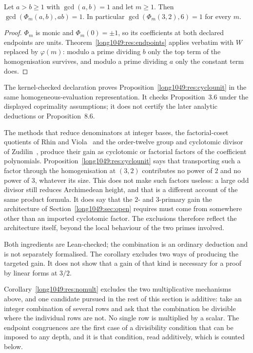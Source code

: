 \documentclass[11pt]{article}
\begin{document}
\begin{proposition}
\label{long1049:res:cyclounit}
Let $a>b\ge1$ with $\gcd(a,b)=1$ and let $m\ge1$.  Then
$\gcd(\Phi_m(a,b),ab)=1$.  In particular $\gcd(\Phi_m(3,2),6)=1$ for every $m$.
\end{proposition}

\begin{proof}
$\Phi_m$ is monic and $\Phi_m(0)=\pm1$, so its coefficients at both declared
endpoints are units.  Theorem~\ref{long1049:res:endpoints} applies verbatim with $W$
replaced by $\varphi(m)$: modulo a prime dividing $b$ only the top term of the
homogenisation survives, and modulo a prime dividing $a$ only the constant term
does.
\end{proof}

The kernel-checked declaration
proves Proposition~\ref{long1049:res:cyclounit} in the same homogeneous-evaluation
representation.  It checks Proposition~3.6 under the displayed coprimality
assumptions; it does not certify the later analytic deductions or
Proposition~8.6.

The methods that reduce denominators at integer bases, the factorial-coset
quotients of Rhin and Viola~\cite{rhinviola1996} and the order-twelve group and
cyclotomic divisor of Zudilin~\cite{zudilin2004}, produce their gain as
cyclotomic or factorial factors of the coefficient polynomials.
Proposition~\ref{long1049:res:cyclounit} says that transporting such a factor through the
homogenisation at $(3,2)$ contributes no power of $2$ and no power of $3$,
whatever its size.  This does not make such factors useless: a large odd
divisor still reduces Archimedean height, and that is a different account of the
same product formula.  It does say that the $2$- and $3$-primary gain the
architecture of Section~\ref{long1049:sec:open} requires must come from somewhere other
than an imported cyclotomic factor.  The exclusions therefore reflect the
architecture itself, beyond the local behaviour of the two primes involved.

\noindent Both ingredients are Lean-checked; the combination is an ordinary
deduction and is not separately formalised.  The corollary excludes two ways of
producing the targeted gain.  It does not show that a gain of that kind is
necessary for a proof by linear forms at \(3/2\).

Corollary~\ref{long1049:res:nomult} excludes the two multiplicative mechanisms above,
and one candidate pursued in the rest of this section is additive: take an
integer combination of several rows and ask that the combination be divisible
where the individual rows are not.  No single row is multiplied by a scalar.  The endpoint
congruences are the first case of a divisibility condition that can be imposed
to any depth, and it is that condition, read additively, which is counted
below.
\end{document}
